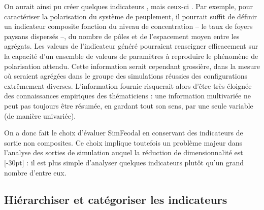On aurait ainsi pu créer quelques indicateurs , mais ceux-ci .
Par exemple, pour caractériser la polarisation du système de peuplement, il pourrait suffit de définir un indicateur composite fonction du niveau de concentration -- le taux de foyers paysans dispersés --, du nombre de pôles et de l'espacement moyen entre les agrégats.
Les valeurs de l'indicateur généré pourraient renseigner efficacement sur la capacité d'un ensemble de valeurs de paramètres à reproduire le phénomène de polarisation attendu.
Cette information serait cependant grossière, dans la mesure où seraient agrégées dans le groupe des \og simulations réussies\fg{} des configurations extrêmement diverses.
L'information fournie risquerait alors d'être très éloignée des connaissances empiriques des thématiciens :
une information multivariée ne peut pas toujours être résumée, en gardant tout son sens, par une seule variable (de manière univariée).

On a donc fait le choix d'évaluer SimFeodal en conservant des indicateurs de sortie non composites.
Ce choix implique toutefois un problème majeur dans l'analyse des sorties de simulation auquel la réduction de dimensionnalité est [-30pt] :
il est plus simple d'analyser quelques indicateurs plutôt qu'un grand nombre d'entre eux.


\subsection{Hiérarchiser et catégoriser les indicateurs}

